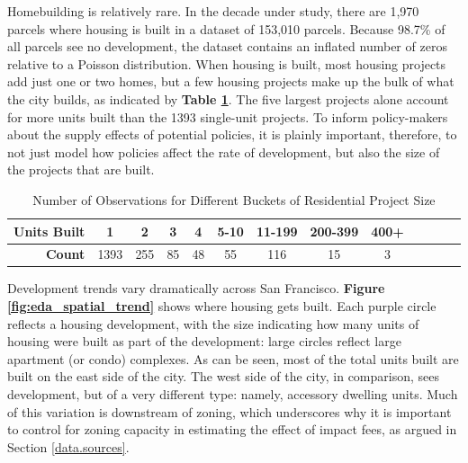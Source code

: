\documentclass[a4paper,12pt]{article}
\begin{document}
Homebuilding is relatively rare. In the decade under study, there are 1,970 parcels where housing is built in a dataset of 153,010 parcels. Because 98.7\% of all parcels see no development, the dataset contains an inflated number of zeros relative to a Poisson distribution. When housing is built, most housing projects add just one or two homes, but a few housing projects make up the bulk of what the city builds, as indicated by \textbf{Table \ref{tab:NetUnitsCompleted}}. The five largest projects alone account for more units built than the 1393 single-unit projects. To inform policy-makers about the supply effects of potential policies, it is plainly important, therefore, to not just model how policies affect the rate of development, but also the size of the projects that are built.


\begin{table}[hbt]
\centering
\caption{Number of Observations for Different Buckets of Residential Project Size}
\setlength{\tabcolsep}{10pt} 
\begin{tabular}{r|cccccccccccc}

\hline
\textbf{Units Built} & 1 & 2 & 3 & 4 & 5-10 & 11-199 & 200-399 & 400+ \\
\hline
\textbf{Count} & 1393 & 255 & 85 & 48 & 55 & 116 & 15 & 3 \\
\hline
\end{tabular}
\label{tab:NetUnitsCompleted}
\end{table}


Development trends vary dramatically across San Francisco. \textbf{Figure \ref{fig:eda_spatial_trend}} shows where housing gets built. Each purple circle reflects a housing development, with the size indicating how many units of housing were built as part of the development: large circles reflect large apartment (or condo) complexes. As can be seen, most of the total units built are built on the east side of the city. The west side of the city, in comparison, sees development, but of a very different type: namely, accessory dwelling units. Much of this variation is downstream of zoning, which underscores why it is important to control for zoning capacity in estimating the effect of impact fees, as argued in Section \ref{data.sources}.
\end{document}
